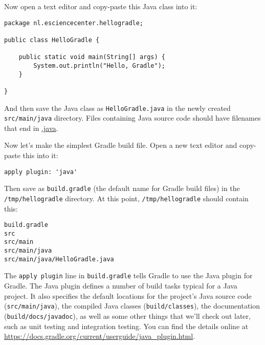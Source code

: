 Now open a text editor and copy-paste this Java class into it:
\begin{lstlisting}[style=basic,style=Java]
package nl.esciencecenter.hellogradle;

public class HelloGradle {

    public static void main(String[] args) {
        System.out.println("Hello, Gradle");
    }

}
\end{lstlisting}
And then save the Java class as \texttt{HelloGradle.java} in the newly created \texttt{src/main/java} directory. Files containing Java source code should have filenames that end in \url{.java}.

Now let's make the simplest Gradle build file. Open a new text editor and copy-paste this into it:
\begin{lstlisting}[style=basic,style=bash]
apply plugin: 'java'
\end{lstlisting}
Then save as \texttt{build.gradle} (the default name for Gradle build files) in the \texttt{\mytilde{}/tmp/hellogradle} directory. At this point, \texttt{\mytilde{}/tmp/hellogradle} should contain this:
\begin{lstlisting}[style=basic,style=bash]
build.gradle
src
src/main
src/main/java
src/main/java/HelloGradle.java
\end{lstlisting}

The \texttt{apply plugin} line in \texttt{build.gradle} tells Gradle to use the Java plugin for Gradle. The Java plugin defines a number of build tasks typical for a Java project. It also specifies the default locations for the project's Java source code (\texttt{src/main/java}), the compiled Java classes (\texttt{build/classes}), the documentation (\texttt{build/docs/javadoc}), as well as some other things that we'll check out later, such as unit testing and integration testing. You can find the details online at \url{https://docs.gradle.org/current/userguide/java_plugin.html}.


